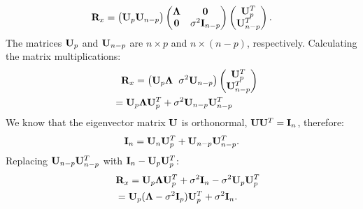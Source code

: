 \documentclass[10pt,technote,peerreview]{IEEEtran}
\begin{document}
\begin{equation}
\nonumber
{\bf R}_x = \big({\bf U}_p {\bf U}_{n-p}\big)
\begin{pmatrix}
\boldsymbol{\Lambda} & {\bf 0}\\
{\bf 0}				 & \sigma^2\textbf{I}_{n-p}\\
\end{pmatrix}
\begin{pmatrix}
{\bf U}_p^T\\ 
{\bf U}_{n-p}^T\\ 
\end{pmatrix}.
\end{equation}
The matrices ${\bf U}_p$ and ${\bf U}_{n-p}$ are $n\times p$ and $n\times (n-p)$, respectively. Calculating the matrix multiplications:
\begin{eqnarray}
\nonumber
{\bf R}_x = \big({\bf U}_p\boldsymbol{\Lambda}\hspace{2mm} \sigma^2 {\bf U}_{n-p}\big)
\begin{pmatrix}
{\bf U}_p^T\\ 
{\bf U}_{n-p}^T\\ 
\end{pmatrix} \\
& 
\hspace{-5.2cm}= {\bf U}_p\boldsymbol{\Lambda}{\bf U}_p^T+\sigma^2{\bf U}_{n-p}{\bf U}_{n-p}^T
\end{eqnarray}
We know that the eigenvector matrix ${\bf U}$ is orthonormal, ${\bf U}{\bf U}^T = \textbf{I}_n$, therefore: 
\begin{equation}
\textbf{I}_n = {\bf U}_{n}{\bf U}_{p}^T + {\bf U}_{n-p}{\bf U}_{n-p}^T.
\end{equation}
Replacing ${\bf U}_{n-p}{\bf U}_{n-p}^T$ with $\textbf{I}_n - {\bf U}_{p}{\bf U}_{p}^T$: 
\begin{eqnarray}
 {\bf R}_x = {\bf U}_p\boldsymbol{\Lambda}{\bf U}_p^T+\sigma^2\textbf{I}_n - \sigma^2{\bf U}_{p}{\bf U}_{p}^T\\
 &\hspace{-5.2cm} = {\bf U}_p(\boldsymbol{\Lambda} - \sigma^2\textbf{I}_p){\bf U}^T_p + \sigma^2\textbf{I}_n.
\end{eqnarray}



\end{document}
